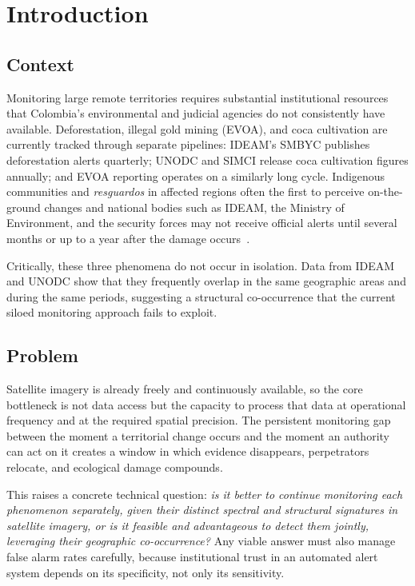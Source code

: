 \documentclass{article}
\begin{document}
\newpage

\section{Introduction}

\subsection{Context}

Monitoring large remote territories requires substantial institutional resources
that Colombia's environmental and judicial agencies do not consistently have
available.
Deforestation, illegal gold mining (EVOA), and coca cultivation are currently
tracked through separate pipelines: IDEAM's SMBYC publishes deforestation alerts
quarterly; UNODC and SIMCI release coca cultivation figures annually; and EVOA
reporting operates on a similarly long cycle.
Indigenous communities and \textit{resguardos} in affected regions often the
first to perceive on-the-ground changes and national bodies such as IDEAM, the
Ministry of Environment, and the security forces may not receive official alerts
until several months or up to a year after the damage occurs~\cite{mongabay_siona2023}.

Critically, these three phenomena do not occur in isolation.
Data from IDEAM and UNODC show that they frequently overlap in the same geographic
areas and during the same periods, suggesting a structural co-occurrence that the
current siloed monitoring approach fails to exploit.

\subsection{Problem}

Satellite imagery is already freely and continuously available, so the core
bottleneck is not data access but the capacity to process that data at operational
frequency and at the required spatial precision.
The persistent monitoring gap between the moment a territorial change occurs and
the moment an authority can act on it creates a window in which evidence
disappears, perpetrators relocate, and ecological damage compounds.

This raises a concrete technical question: \textit{is it better to continue
monitoring each phenomenon separately, given their distinct spectral and
structural signatures in satellite imagery, or is it feasible and advantageous to
detect them jointly, leveraging their geographic co-occurrence?}
Any viable answer must also manage false alarm rates carefully, because
institutional trust in an automated alert system depends on its specificity,
not only its sensitivity.
\end{document}
